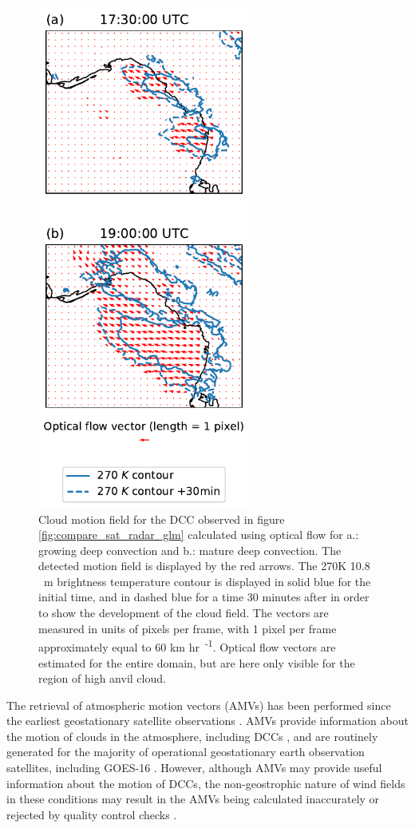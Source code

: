 \documentclass[amt, manuscript]{copernicus}
\begin{document}
\begin{figure}[t]
    \includegraphics[width=7cm]{figure04.pdf}
    \caption{Cloud motion field for the DCC observed in figure \ref{fig:compare_sat_radar_glm} calculated using optical flow for a.: growing deep convection and b.: mature deep convection. The detected motion field is displayed by the red arrows. The 270K 10.8 \unit{\mu m} brightness temperature contour is displayed in solid blue for the initial time, and in dashed blue for a time 30 minutes after in order to show the development of the cloud field. The vectors are measured in units of pixels per frame, with 1 pixel per frame approximately equal to 60 \unit{km} \unit{hr\textsuperscript{-1}}. Optical flow vectors are estimated for the entire domain, but are here only visible for the region of high anvil cloud.}
    \label{fig:optical_flow}
\end{figure}


The retrieval of atmospheric motion vectors (AMVs) has been performed since the earliest geostationary satellite observations \citep{menzel_cloud_2001}.
AMVs provide information about the motion of clouds in the atmosphere, including DCCs \citep{bedka_application_2005}, and are routinely generated for the majority of operational geostationary earth observation satellites, including GOES-16 \citep{daniels_algorithm_nodate}. 
However, although AMVs may provide useful information about the motion of DCCs, the non-geostrophic nature of wind fields in these conditions may result in the AMVs being calculated inaccurately or rejected by quality control checks \citep{bedka_application_2005}.
\end{document}
